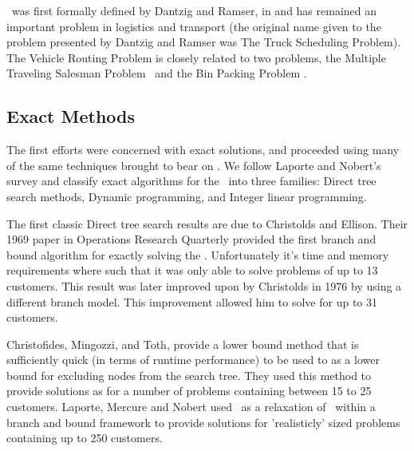
\VRP\ was first formally defined by Dantzig and Ramser, in \cite{Dantzig:1959} and has remained an important problem in logistics and transport (the original name given to the problem presented by Dantzig and Ramser was The Truck Scheduling Problem). The Vehicle Routing Problem is closely related to two problems, the Multiple Traveling Salesman Problem \MTSP\ and the Bin Packing Problem \BPP.

\subsection{Exact Methods}

The first efforts were concerned with exact solutions, and proceeded using many of the same techniques brought to bear on \TSP. 
We follow Laporte and Nobert's survey \cite{LANO:87} and classify exact algorithms for the \VRP\ into three families: Direct tree search methods, Dynamic programming, and Integer linear programming.

The first classic Direct tree search results are due to Christolds and Ellison. Their 1969 paper in Operations Research Quarterly provided the first branch and bound algorithm for exactly solving the \VRP \cite{CE:1969}. Unfortunately it's time and memory requirements where such that it was only able to solve problems of up to 13 customers. This result was later improved upon by Christolds in 1976 by using a different branch model. This improvement allowed him to solve for up to 31 customers. 

Christofides, Mingozzi, and Toth, \cite{CMT:1981} provide a lower bound method that is sufficiently quick (in terms of runtime performance) to be used to as a lower bound for excluding nodes from the search tree. They used this method to provide solutions as for a number of problems containing between 15 to 25 customers. Laporte, Mercure and Nobert \cite{LMN:1986} used \MTSP\ as a relaxation of \VRP\ within a branch and bound framework to provide solutions for 'realisticly' sized problems containing up to 250 customers.  

